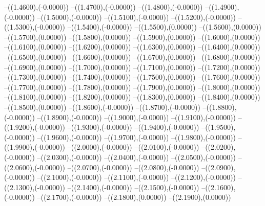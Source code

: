 {	--({\sx*(1.4600)},{\sy*(-0.0000)})
	--({\sx*(1.4700)},{\sy*(-0.0000)})
	--({\sx*(1.4800)},{\sy*(-0.0000)})
	--({\sx*(1.4900)},{\sy*(-0.0000)})
	--({\sx*(1.5000)},{\sy*(-0.0000)})
	--({\sx*(1.5100)},{\sy*(-0.0000)})
	--({\sx*(1.5200)},{\sy*(-0.0000)})
	--({\sx*(1.5300)},{\sy*(-0.0000)})
	--({\sx*(1.5400)},{\sy*(-0.0000)})
	--({\sx*(1.5500)},{\sy*(0.0000)})
	--({\sx*(1.5600)},{\sy*(0.0000)})
	--({\sx*(1.5700)},{\sy*(0.0000)})
	--({\sx*(1.5800)},{\sy*(0.0000)})
	--({\sx*(1.5900)},{\sy*(0.0000)})
	--({\sx*(1.6000)},{\sy*(0.0000)})
	--({\sx*(1.6100)},{\sy*(0.0000)})
	--({\sx*(1.6200)},{\sy*(0.0000)})
	--({\sx*(1.6300)},{\sy*(0.0000)})
	--({\sx*(1.6400)},{\sy*(0.0000)})
	--({\sx*(1.6500)},{\sy*(0.0000)})
	--({\sx*(1.6600)},{\sy*(0.0000)})
	--({\sx*(1.6700)},{\sy*(0.0000)})
	--({\sx*(1.6800)},{\sy*(0.0000)})
	--({\sx*(1.6900)},{\sy*(0.0000)})
	--({\sx*(1.7000)},{\sy*(0.0000)})
	--({\sx*(1.7100)},{\sy*(0.0000)})
	--({\sx*(1.7200)},{\sy*(0.0000)})
	--({\sx*(1.7300)},{\sy*(0.0000)})
	--({\sx*(1.7400)},{\sy*(0.0000)})
	--({\sx*(1.7500)},{\sy*(0.0000)})
	--({\sx*(1.7600)},{\sy*(0.0000)})
	--({\sx*(1.7700)},{\sy*(0.0000)})
	--({\sx*(1.7800)},{\sy*(0.0000)})
	--({\sx*(1.7900)},{\sy*(0.0000)})
	--({\sx*(1.8000)},{\sy*(0.0000)})
	--({\sx*(1.8100)},{\sy*(0.0000)})
	--({\sx*(1.8200)},{\sy*(0.0000)})
	--({\sx*(1.8300)},{\sy*(0.0000)})
	--({\sx*(1.8400)},{\sy*(0.0000)})
	--({\sx*(1.8500)},{\sy*(0.0000)})
	--({\sx*(1.8600)},{\sy*(-0.0000)})
	--({\sx*(1.8700)},{\sy*(-0.0000)})
	--({\sx*(1.8800)},{\sy*(-0.0000)})
	--({\sx*(1.8900)},{\sy*(-0.0000)})
	--({\sx*(1.9000)},{\sy*(-0.0000)})
	--({\sx*(1.9100)},{\sy*(-0.0000)})
	--({\sx*(1.9200)},{\sy*(-0.0000)})
	--({\sx*(1.9300)},{\sy*(-0.0000)})
	--({\sx*(1.9400)},{\sy*(-0.0000)})
	--({\sx*(1.9500)},{\sy*(-0.0000)})
	--({\sx*(1.9600)},{\sy*(-0.0000)})
	--({\sx*(1.9700)},{\sy*(-0.0000)})
	--({\sx*(1.9800)},{\sy*(-0.0000)})
	--({\sx*(1.9900)},{\sy*(-0.0000)})
	--({\sx*(2.0000)},{\sy*(-0.0000)})
	--({\sx*(2.0100)},{\sy*(-0.0000)})
	--({\sx*(2.0200)},{\sy*(-0.0000)})
	--({\sx*(2.0300)},{\sy*(-0.0000)})
	--({\sx*(2.0400)},{\sy*(-0.0000)})
	--({\sx*(2.0500)},{\sy*(-0.0000)})
	--({\sx*(2.0600)},{\sy*(-0.0000)})
	--({\sx*(2.0700)},{\sy*(-0.0000)})
	--({\sx*(2.0800)},{\sy*(-0.0000)})
	--({\sx*(2.0900)},{\sy*(-0.0000)})
	--({\sx*(2.1000)},{\sy*(-0.0000)})
	--({\sx*(2.1100)},{\sy*(-0.0000)})
	--({\sx*(2.1200)},{\sy*(-0.0000)})
	--({\sx*(2.1300)},{\sy*(-0.0000)})
	--({\sx*(2.1400)},{\sy*(-0.0000)})
	--({\sx*(2.1500)},{\sy*(-0.0000)})
	--({\sx*(2.1600)},{\sy*(-0.0000)})
	--({\sx*(2.1700)},{\sy*(-0.0000)})
	--({\sx*(2.1800)},{\sy*(0.0000)})
	--({\sx*(2.1900)},{\sy*(0.0000)})
}
